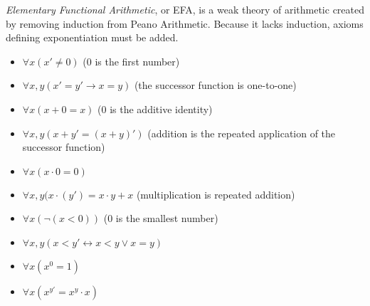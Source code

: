 \documentclass[12pt]{article}
\begin{document}
\emph{Elementary Functional Arithmetic}, or EFA, is a weak theory of arithmetic created by removing induction from Peano Arithmetic.  Because it lacks induction, axioms defining exponentiation must be added.

\begin{itemize}
\item $\forall x (x'\neq 0)$ ($0$ is the first number)

\item $\forall x,y (x'=y'\rightarrow x=y)$ (the successor function is one-to-one)

\item $\forall x (x+0=x)$ ($0$ is the additive identity)

\item $\forall x,y(x+y'=(x+y)')$ (addition is the repeated application of the successor function)

\item $\forall x(x\cdot 0=0)$

\item $\forall x,y(x\cdot(y')=x\cdot y+x$ (multiplication is repeated addition)

\item $\forall x(\neg (x<0))$ ($0$ is the smallest number)

\item $\forall x,y(x<y'\leftrightarrow x<y\vee x=y)$

\item $\forall x(x^0=1)$

\item $\forall x(x^{y'}=x^y\cdot x)$

\end{itemize}
\end{document}
